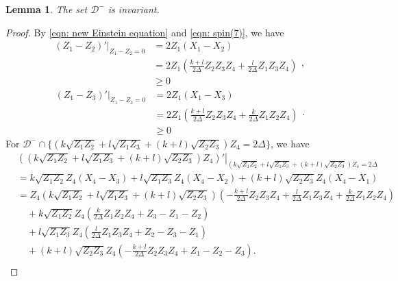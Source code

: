 \documentclass[11pt,letterpaper]{amsart}
\newtheorem{lemma}[theorem]{Lemma}
\theoremstyle{definition}
\numberwithin{equation}{section}
\begin{document}
\begin{lemma}
\label{lem: invariant-}
The set $\mathcal{D}^-$ is invariant.
\end{lemma}
\begin{proof}
By \eqref{eqn: new Einstein equation} and \eqref{eqn: spin(7)}, we have 
\begin{equation}
\label{eqn: Z1>Z2}
\begin{split}
\left.(Z_1-Z_2)'\right|_{Z_1-Z_2=0}&=2Z_1(X_1-X_2)\\
&=2Z_1\left(\frac{k+l}{2\Delta}Z_2Z_3Z_4+\frac{l}{2\Delta}Z_1Z_3Z_4\right)\\
&\geq 0
\end{split},
\end{equation}
\begin{equation}
\label{eqn: Z1>Z3}
\begin{split}
\left.(Z_1-Z_3)'\right|_{Z_1-Z_3=0}&=2Z_1(X_1-X_3)\\
&=2Z_1\left(\frac{k+l}{2\Delta}Z_2Z_3Z_4+\frac{k}{2\Delta}Z_1Z_2Z_4\right)\\
&\geq 0
\end{split}.
\end{equation}
For $\mathcal{D}^-\cap \{\left(k\sqrt{Z_1Z_2}+l\sqrt{Z_1Z_3}+(k+l)\sqrt{Z_2Z_3}\right)Z_4= 2\Delta\}$, we have 
\begin{equation}
\label{eqn: technical computation 2-1}
\begin{split}
&\left.\left(\left(k\sqrt{Z_1Z_2}+l\sqrt{Z_1Z_3}+(k+l)\sqrt{Z_2Z_3}\right)Z_4\right)'\right|_{\left(k\sqrt{Z_1Z_2}+l\sqrt{Z_1Z_3}+(k+l)\sqrt{Z_2Z_3}\right)Z_4=2\Delta}
\\
&=k\sqrt{Z_1Z_2}Z_4(X_4-X_3)+l\sqrt{Z_1Z_3}Z_4(X_4-X_2)+(k+l)\sqrt{Z_2Z_3}Z_4(X_4-X_1)\\
&=Z_4(k\sqrt{Z_1Z_2}+l\sqrt{Z_1Z_3}+(k+l)\sqrt{Z_2Z_3})\left(-\frac{k+l}{2\Delta}Z_2Z_3Z_4+\frac{l}{2\Delta}Z_1Z_3Z_4+\frac{k}{2\Delta}Z_1Z_2Z_4\right) \\
&\quad +k\sqrt{Z_1Z_2}Z_4\left(\frac{k}{2\Delta}Z_1Z_2Z_4+Z_3-Z_1-Z_2\right)\\
&\quad +l\sqrt{Z_1Z_3}Z_4\left(\frac{l}{2\Delta}Z_1Z_3Z_4+Z_2-Z_3-Z_1\right)\\
&\quad +(k+l)\sqrt{Z_2Z_3}Z_4\left(-\frac{k+l}{2\Delta}Z_2Z_3Z_4+Z_1-Z_2-Z_3\right).\\

\end{split}
\end{equation}
\end{proof}
\end{document}
